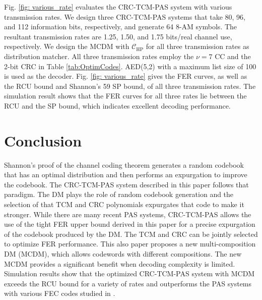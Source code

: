 \documentclass [PhD] {uclathes}
\begin{document}
Fig. \ref{fig: various_rate} evaluates the CRC-TCM-PAS system with various transmission rates. We design three CRC-TCM-PAS systems that take 80, 96, and 112 information bits, respectively, and generate 64 8-AM symbols. The resultant transmission rates are 1.25, 1.50, and 1.75 bits/real channel use, respectively. We design the MCDM with $\mathcal{C}_{\text{HP}}$ for all three transmission rates as distribution matcher. All three transmission rates employ the $\nu=7$ CC and the 2-bit CRC in Table \ref{tab:OptimCodes}. AED(5,2) with a maximum list size of 100 is used as the decoder.
Fig. \ref{fig: various_rate} gives the FER curves, as well as the RCU bound and Shannon's 59 SP bound, of all three transmission rates. The simulation result shows that the FER curves for all three rates lie between the RCU and the SP bound, which indicates excellent decoding performance.

\section{Conclusion}\label{sec: conclusion_3}
Shannon's proof of the channel coding theorem \cite{shannon1948mathematical} generates a random codebook that has an optimal distribution and then performs an expurgation to improve the codebook.  The CRC-TCM-PAS system described in this paper follows that paradigm.  The DM plays the role of random codebook generation and the selection of that TCM and CRC polynomials expurgates that code to make it stronger. While there are many recent PAS systems, CRC-TCM-PAS allows the use of the tight FER upper bound derived in this paper for a precise expurgation of the codebook produced by the DM.  The TCM and CRC can be jointly selected to optimize FER performance.  This also paper proposes a new multi-composition DM (MCDM), which allows codewords with different compositions.  The new MCDM provides a significant benefit when decoding complexity is limited.
Simulation results show that the optimized CRC-TCM-PAS system with MCDM exceeds the RCU bound for a variety of rates and outperforms the PAS systems with various FEC codes studied in \cite{cocskun2019efficient}.



%
\end{document}
